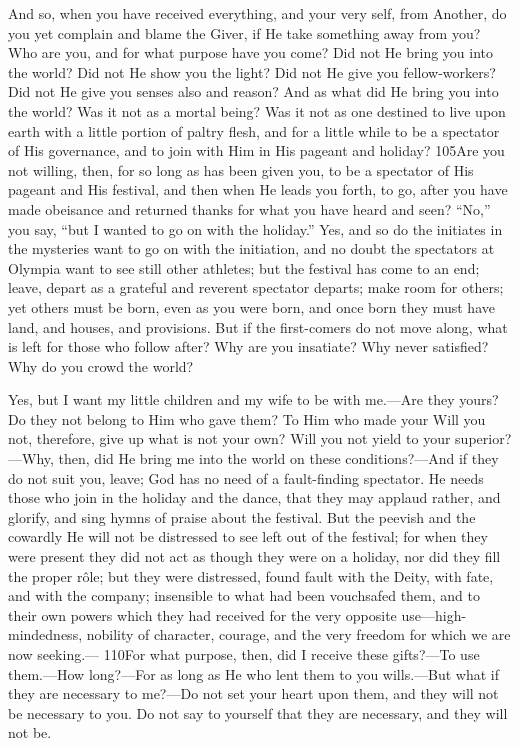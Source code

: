 And so, when you have received everything, and your very self, from Another, do you yet complain and blame the Giver, if He take something away from you? Who are you, and for what purpose have you come? Did not He bring you into the world? Did not He show you the light? Did not He give you fellow-workers? Did not He give you senses also and reason? And as what did He bring you into the world? Was it not as a mortal being? Was it not as one destined to live upon earth with a little portion of paltry flesh, and for a little while to be a spectator of His governance, and to join with Him in His pageant and holiday? 105Are you not willing, then, for so long as has been given you, to be a spectator of His pageant and His festival, and then when He leads you forth, to go, after you have made obeisance and returned thanks for what you have heard and seen? ``No,'' you say, ``but I wanted to go on with the holiday.'' Yes, and so do the initiates in the mysteries want to go on with the initiation, and no doubt the spectators at Olympia want to see still other athletes; but the festival has come to an end; leave, depart as a grateful and reverent spectator departs; make room for others; yet others must be born, even as you were born, and once born they must have land, and houses, and provisions. But if the first-comers do not move along, what is left for those who follow after? Why are you insatiate? Why never satisfied? Why do you crowd the world?

Yes, but I want my little children and my wife to be with me.—Are they yours? Do they not belong to Him who gave them? To Him who made your Will you not, therefore, give up what is not your own? Will you not yield to your superior?—Why, then, did He bring me into the world on these conditions?—And if they do not suit you, leave; God has no need of a fault-finding spectator. He needs those who join in the holiday and the dance, that they may applaud rather, and glorify, and sing hymns of praise about the festival. But the peevish and the cowardly He will not be distressed to see left out of the festival; for when they were present they did not act as though they were on a holiday, nor did they fill the proper rôle; but they were distressed, found fault with the Deity, with fate, and with the company; insensible to what had been vouchsafed them, and to their own powers which they had received for the very opposite use—high-mindedness, nobility of character, courage, and the very freedom for which we are now seeking.— 110For what purpose, then, did I receive these gifts?—To use them.—How long?—For as long as He who lent them to you wills.—But what if they are necessary to me?—Do not set your heart upon them, and they will not be necessary to you. Do not say to yourself that they are necessary, and they will not be.

